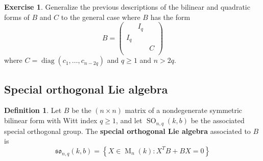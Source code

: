 \documentclass[12pt]{article}
\theoremstyle{definition}
\newtheorem{definition}[theorem]{Definition}
\newtheorem{exercise}[theorem]{Exercise}
\numberwithin{theorem}{subsection}
\newcommand{\lb}{\left\{}
\newcommand{\rb}{\right\}}
\newcommand{\tbf}{\textbf}
\DeclareMathOperator{\M}{M}
\DeclareMathOperator{\SO}{SO}
\DeclareMathOperator{\diag}{diag}
\begin{document}
\begin{exercise}
Generalize the previous descriptions of the bilinear and quadratic forms of $B$ and $C$ to the general case where $B$ has the form
\[
	B = 
	\begin{pmatrix}
		& I_q \\
		I_q \\
		&& C  \\
	\end{pmatrix}
\]
where $C = \diag(c_1, \ldots, c_{n-2q})$ and $q \ge 1$ and $n > 2q$.
\end{exercise}

\subsection{Special orthogonal Lie algebra}
\label{special orthogonal Lie algebra}

\begin{definition}
Let $B$ be the $(n \times n)$ matrix of a nondegenerate symmetric bilinear form with Witt index $q \ge 1$, and let $\SO_{n,q}(k,b)$ be the associated special orthogonal group. The \tbf{special orthogonal Lie algebra} associated to $B$ is
\[
	\mathfrak{so}_{n,q}(k,b) = \lb X \in \M_n(k) : X^T B + BX = 0 \rb
\]
\end{definition}
\end{document}
